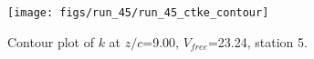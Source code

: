 \begin{figure}[H]
\centering
\texttt{[image: figs/run\_45/run\_45\_ctke\_contour]}
\caption{Contour plot of $k$ at $z/c$=9.00, $V_{free}$=23.24, station 5.}
\label{fig:run_45_ctke_contour}
\end{figure}


